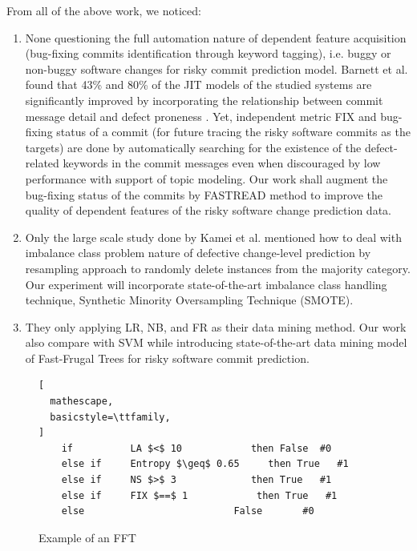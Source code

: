 \documentclass[10pt,conference]{IEEEtran}
\begin{document}
From all of the above work, we noticed: 
\begin{enumerate}
    \item None questioning the full automation nature of dependent feature acquisition (bug-fixing commits identification through keyword tagging), i.e. buggy or non-buggy software changes for risky commit prediction model. Barnett et al. found that 43\% and 80\% of the JIT models of the studied systems are significantly improved by incorporating the relationship between commit message detail and defect proneness \cite{barnett13_mcontent}. Yet, independent metric FIX and bug-fixing status of a commit (for future tracing the risky software commits as the targets) are done by automatically searching for the existence of the defect-related keywords in the commit messages even when discouraged by low performance with support of topic modeling. Our work shall augment the bug-fixing status of the commits by FASTREAD method to improve the quality of dependent features of the risky software change prediction data. 
    \item Only the large scale study done by Kamei et al. \cite{kamei12_jit} mentioned how to deal with imbalance class problem nature of defective change-level prediction by resampling approach to randomly delete instances from the majority category. Our experiment will incorporate state-of-the-art imbalance class handling technique, Synthetic Minority Oversampling Technique (SMOTE). 
    \item They only applying LR, NB, and FR as their data mining method. Our work also compare with SVM while introducing state-of-the-art data mining model of Fast-Frugal Trees for risky software commit prediction.    
\end{enumerate}

\begin{figure}[!b]

 {\normalsize
\begin{minipage}{\linewidth}

\vspace{-5mm}
\footnotesize
\begin{lstlisting}[
  mathescape,
  basicstyle=\ttfamily,
]
    if          LA $<$ 10            then False  #0
    else if     Entropy $\geq$ 0.65     then True   #1
    else if     NS $>$ 3             then True   #1
    else if     FIX $==$ 1            then True   #1
    else                          False       #0
\end{lstlisting}
  
\end{minipage}
}
\caption{Example of an FFT}
\label{fig:fft1}
\end{figure}
\end{document}
